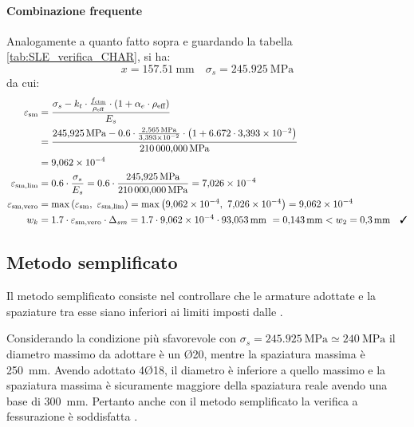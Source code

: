  \paragraph{Combinazione frequente}
 Analogamente a quanto fatto sopra e guardando la tabella \ref{tab:SLE_verifica_CHAR}, si ha:
\[
    x = \SI{157.51}{\milli\metre} \quad \sigma_{s} = \SI{245.925}{\mega\pascal}
\] 
da cui:
\[
\begin{split}
    \varepsilon_\textup{sm} 
    &= \frac{ \sigma_{s} - k_{t} \cdot \frac{ f_\textup{ctm} }{ \rho_\textup{eff} } \cdot \left( 1 + \alpha_{e} \cdot \rho_\textup{eff} \right) }{ E_{s} }  \\
    &= \frac{ \SI{245.925}{\mega\pascal} - 0.6 \cdot \frac{ \SI{2.565}{\mega\pascal} }{\num{3.393e-2 } } \cdot \left( 1 + 6.672 \cdot\num{3.393e-2 } \right) }{ \SI{210000.000}{\mega\pascal} } \\
    &=\num{9.062e-4 }  \\
    \varepsilon_\textup{sm,lim} 
    &= 0.6 \cdot \frac{ \sigma_{s} }{ E_{s} }  
    = 0.6 \cdot \frac{ \SI{245.925}{\mega\pascal} }{ \SI{210000.000}{\mega\pascal} } 
    =\num{7.026e-4 }  \\
    \varepsilon_\textup{sm,vero} 
    &= \max { \left( \varepsilon_\textup{sm} ,\  \varepsilon_\textup{sm,lim} \right) }  
    = \max { \left(\num{9.062e-4 } ,\ \num{7.026e-4 } \right) } 
    =\num{9.062e-4 }  \\
    w_{k} 
    &= 1.7 \cdot \varepsilon_\textup{sm,vero} \cdot \Delta_{sm}  
    =  1.7 \cdot\num{9.062e-4 } \cdot \SI{93.053}{\milli\metre} \ 
    = \SI{0.143}{\milli\metre}  < w_2 = \SI{0.3}{\milli\metre} \quad \checked\\
\end{split}
\]
\subsection{Metodo semplificato}
Il metodo semplificato consiste nel controllare che le armature adottate e la spaziature tra esse siano inferiori ai limiti imposti dalle .

Considerando la condizione più sfavorevole con $\sigma_{s} = \SI{245.925}{\mega\pascal} \simeq \SI{240}{\mega\pascal}$ il diametro massimo da adottare è un Ø20, mentre la spaziatura massima è \SI{250}{\milli\metre}. 
Avendo adottato 4Ø18, il diametro è inferiore a quello massimo e la spaziatura massima è sicuramente maggiore della spaziatura reale avendo una base di \SI{300}{\milli\metre}. 
Pertanto anche con il metodo semplificato la verifica a fessurazione è soddisfatta \checked.

